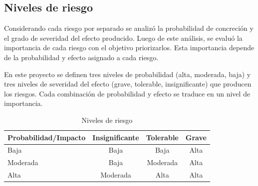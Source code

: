 \documentclass[a4paper,openright,12pt]{report}
\begin{document}
\subsection{Niveles de riesgo}


Considerando cada riesgo por separado se analizó  la probabilidad de
concreción y el grado de  severidad del efecto producido. Luego de este análisis,
se evaluó  la importancia de cada riesgo con el objetivo priorizarlos. Esta importancia depende de
la probabilidad y  efecto asignado a cada riesgo.

En este proyecto se definen tres niveles de probabilidad (alta, moderada, baja) y tres
niveles de severidad del efecto (grave, tolerable, insignificante) que producen los riesgos.
Cada combinación de probabilidad y efecto se traduce en un nivel de importancia.

\begin{table}[H]
\centering
\caption{Niveles de riesgo}
\label{my-label}
\begin{tabular}{|l|c|c|c|}
\hline
\multicolumn{1}{|c|}{Probabilidad/Impacto} & Insignificante & Tolerable & Grave \\ \hline
Baja                                       & Baja           & Baja      & Alta  \\ \hline
Moderada                                   & Baja           & Moderada  & Alta  \\ \hline
Alta                                       & Moderada       & Alta      & Alta  \\ \hline
\end{tabular}
\end{table}
\end{document}
